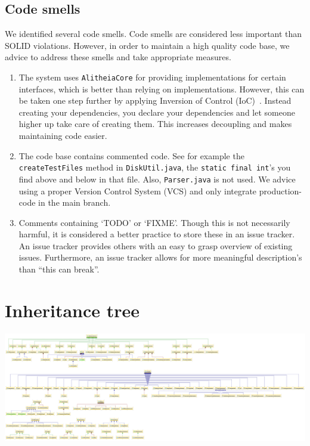 \documentclass{article}
\begin{document}
\subsection{Code smells}
We identified several code smells. Code smells are considered less important than SOLID violations. However, in order to maintain a high quality code base, we advice to address these smells and take appropriate measures.

\begin{enumerate}
\item The system uses \verb|AlitheiaCore| for providing implementations for certain interfaces, which is better than relying on implementations. However, this can be taken one step further by applying Inversion of Control (IoC)~\cite{ioc}. Instead creating your dependencies, you declare your dependencies and let someone higher up take care of creating them. This increases decoupling and makes maintaining code easier.

\item The code base contains commented code. See for example the \verb|createTestFiles| method in \verb|DiskUtil.java|, the \verb|static final int|'s you find above and below in that file. Also, \verb|Parser.java| is not used. We advice using a proper Version Control System (VCS) and only integrate production-code in the main branch.

\item Comments containing `TODO' or `FIXME'. Though this is not necessarily harmful, it is considered a better practice to store these in an issue tracker. An issue tracker provides others with an easy to grasp overview of existing issues. Furthermore, an issue tracker allows for more meaningful description's than ``this can break''.
\end{enumerate}




\newpage
\appendix
\section{Inheritance tree} \label{app:inheritance}

\begin{sideways}
	\includegraphics[width=1.3\textwidth]{inheritance-diagram}
	\label{fig:inheritance}
\end{sideways}
\end{document}
